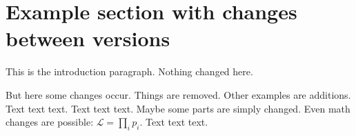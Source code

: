 \documentclass[a4paper,12pt]{article}
\begin{document}
\section{Example section with changes between versions}
This is the introduction paragraph. Nothing changed here.

But here some changes occur. Things are removed. Other examples are additions. Text text text.
Text text text. Maybe some parts are simply changed. Even math changes are possible: $\mathcal{L} = \prod_i p_i$. Text text text.
\end{document}
